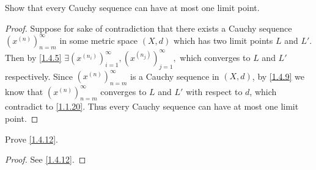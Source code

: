 \begin{ex}\label{ex:1.4.6}
  Show that every Cauchy sequence can have at most one limit point.
\end{ex}

\begin{proof}
  Suppose for sake of contradiction that there exists a Cauchy sequence \((x^{(n)})_{n = m}^\infty\) in some metric space \((X, d)\) which has two limit points \(L\) and \(L'\).
  Then by \cref{1.4.5} \(\exists (x^{(n_i)})_{i = 1}^\infty, (x^{(n_j)})_{j = 1}^\infty,\) which converges to \(L\) and \(L'\) respectively.
  Since \((x^{(n)})_{n = m}^\infty\) is a Cauchy sequence in \((X, d)\), by \cref{1.4.9} we know that \((x^{(n)})_{n = m}^\infty\) converges to \(L\) and \(L'\) with respect to \(d\), which contradict to \cref{1.1.20}.
  Thus every Cauchy sequence can have at most one limit point.
\end{proof}

\begin{ex}\label{ex:1.4.7}
  Prove \cref{1.4.12}.
\end{ex}

\begin{proof}
  See \cref{1.4.12}.
\end{proof}

